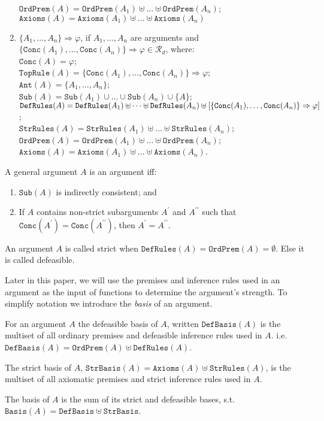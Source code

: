 \documentclass[runningheads]{llncs}
\newcommand{\Rd}{\mathcal{R}_d}
\newcommand{\pr}{^\prime}
\newcommand{\Ord}{\texttt{OrdPrem}}
\newcommand{\Ax}{\texttt{Axioms}}
\newcommand{\Conc}{\texttt{Conc}}
\newcommand{\DefRules}{\texttt{DefRules}}
\newcommand{\StrRules}{\texttt{StrRules}}
\newcommand{\TopRule}{\texttt{TopRule}}
\newcommand{\Ant}{\texttt{Ant}}
\newcommand{\Sub}{\texttt{Sub}}
\newcommand{\B}{\texttt{Basis}}
\newcommand{\DefB}{\texttt{DefBasis}}
\newcommand{\StrB}{\texttt{StrBasis}}
\begin{document}
\begin{definition}
\begin{enumerate}
    $\Ord(A) = \Ord(A_1) \uplus \dots \uplus \Ord(A_n)$;\\
    $\Ax(A) = \Ax(A_1) \uplus \dots \uplus \Ax(A_n)$
    \item $\{A_1, \dots, A_n\} \Rightarrow \varphi$, if $A_1, \dots, A_n$ are arguments and \\$\{\Conc(A_1), \dots, \Conc(A_n)\} \Rightarrow \varphi \in \Rd$, where:\\
    $\Conc(A) = \varphi$;\\
    $\TopRule(A) = \{\Conc(A_1), \dots, \Conc(A_n)\} \Rightarrow \varphi$;\\
    $\Ant(A) = \{ A_1, \dots, A_n \}$;\\
    $\Sub(A) = \Sub(A_1) \cup \dots \cup \Sub(A_n) \cup \{A\}$;\\
    $\DefRules(A) \\= \DefRules(A_1) \uplus \dots \uplus \DefRules(A_n) \uplus [\{\Conc(A_1), \dots, \Conc(A_n)\} \Rightarrow \varphi]$;\\
    $\StrRules(A) = \StrRules(A_1) \uplus \dots \uplus \StrRules(A_n)$;\\
    $\Ord(A) = \Ord(A_1) \uplus \dots \uplus \Ord(A_n)$;\\
    $\Ax(A) = \Ax(A_1) \uplus \dots \uplus \Ax(A_n)$.
\end{enumerate}

A general argument $A$ is an argument iff:
\begin{enumerate}
    \item $\Sub(A)$ is indirectly consistent; and
    \item If $A$ contains non-strict subarguments $A\pr$ and $A^{\prime\prime}$ such that $\Conc(A\pr) = \Conc(A^{\prime\prime})$, then $A\pr = A^{\prime\prime}$.
\end{enumerate}
An argument $A$ is called strict when $\DefRules(A) = \Ord(A) = \emptyset$. Else it is called defeasible.
\end{definition}

Later in this paper, we will use the premises and inference rules used in an argument as the input of functions to determine the argument's strength. To simplify notation we introduce the \textit{basis} of an argument.

\begin{definition}\label{Basis}
For an argument $A$ the defeasible basis of $A$, written $\DefB(A)$ is the multiset of all ordinary premises and defeasible inference rules used in $A$. i.e. $\DefB(A) = \Ord(A) \uplus \DefRules(A)$.

The strict basis of $A$, $\StrB(A) = \Ax(A) \uplus \StrRules(A)$, is the multiset of all axiomatic premises and strict inference rules used in $A$.

The basis of $A$ is the sum of its strict and defeasible bases, s.t. $\B(A) = \DefB \uplus \StrB$.
\end{definition}
\end{document}

